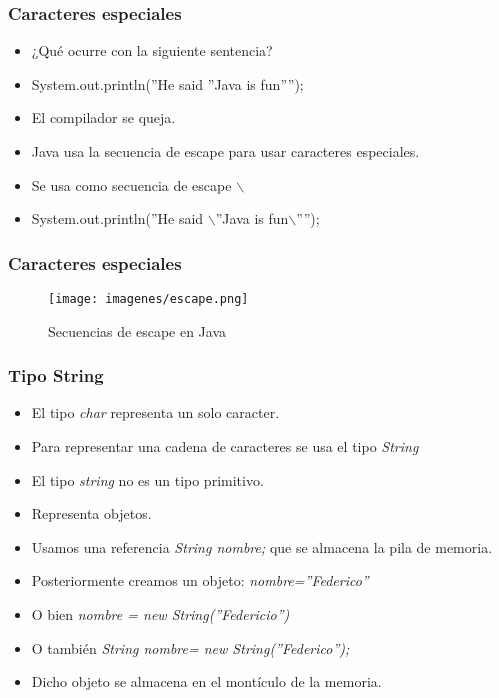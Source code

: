\documentclass{beamer}
\begin{document}
\begin{frame}
\frametitle{Caracteres especiales}
\begin{itemize}[<+-|alert@+>]
\item ¿Qué ocurre con la siguiente sentencia?
\item System.out.println(''He said ''Java is fun'''');
\item El compilador se queja. 
\item Java usa la secuencia de escape para usar caracteres especiales.
\item Se usa como secuencia de escape $\backslash$
\item System.out.println(''He said $\backslash$''Java is fun$\backslash$'''');
\end{itemize}
\pause

\end{frame}

\begin{frame}
\frametitle{Caracteres especiales} 
\begin{figure}
\texttt{[image: imagenes/escape.png]} 
\caption{Secuencias de escape en Java}
\end{figure}
\pause
 
\end{frame}


\begin{frame}
\frametitle{Tipo String}
\begin{itemize}[<+-|alert@+>]
\item El tipo \emph{char} representa un solo caracter.
\item Para representar una cadena de caracteres se usa el tipo \emph{String}
\item El tipo \emph{string} no es un tipo primitivo.
\item Representa objetos.
\item Usamos una referencia \emph{String nombre;} que se almacena la pila de memoria.
\item Posteriormente creamos un objeto: \emph{nombre=''Federico''}
\item O bien \emph{nombre = new String(''Federicio'')}
\item O también \emph{String nombre= new String(''Federico'');}
\item Dicho objeto se almacena en el montículo de la memoria.
\end{itemize}
\pause

\end{frame}
\end{document}
